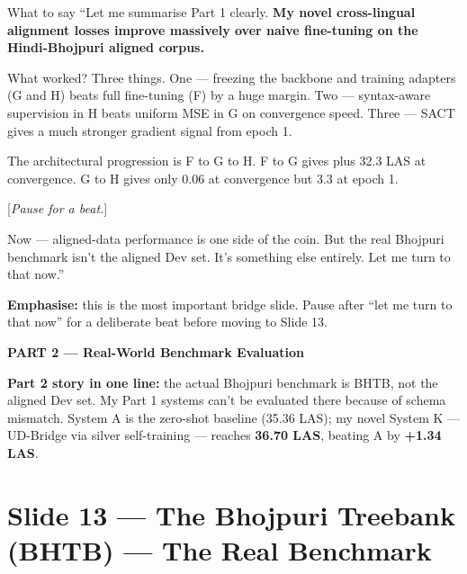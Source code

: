 \documentclass[11pt]{article}
\begin{document}
\begin{pitchbox}{What to say}
``Let me summarise Part 1 clearly. \textbf{My novel cross-lingual alignment losses improve massively over naive fine-tuning on the Hindi-Bhojpuri aligned corpus.}

What worked? Three things. One --- freezing the backbone and training adapters (G and H) beats full fine-tuning (F) by a huge margin. Two --- syntax-aware supervision in H beats uniform MSE in G on convergence speed. Three --- SACT gives a much stronger gradient signal from epoch 1.

The architectural progression is F to G to H. F to G gives plus 32.3 LAS at convergence. G to H gives only 0.06 at convergence but 3.3 at epoch 1.

[\textit{Pause for a beat.}]

Now --- aligned-data performance is one side of the coin. But the real Bhojpuri benchmark isn't the aligned Dev set. It's something else entirely. Let me turn to that now.''
\end{pitchbox}

\begin{tipbox}
\textbf{Emphasise:} this is the most important bridge slide. Pause after ``let me turn to that now'' for a deliberate beat before moving to Slide 13.
\end{tipbox}

\clearpage

\begin{center}
{\LARGE\bfseries\color{part2color}PART 2 --- Real-World Benchmark Evaluation}
\end{center}

\vspace{0.3cm}
\begin{tcolorbox}[colback=part2color!5,colframe=part2color,boxrule=0.5pt]
\textbf{Part 2 story in one line:} the actual Bhojpuri benchmark is BHTB, not the aligned Dev set. My Part 1 systems can't be evaluated there because of schema mismatch. System A is the zero-shot baseline (35.36 LAS); my novel System K --- UD-Bridge via silver self-training --- reaches \textbf{36.70 LAS}, beating A by \textbf{+1.34 LAS}.
\end{tcolorbox}

\section{Slide 13 --- The Bhojpuri Treebank (BHTB) --- The Real Benchmark}
\end{document}
